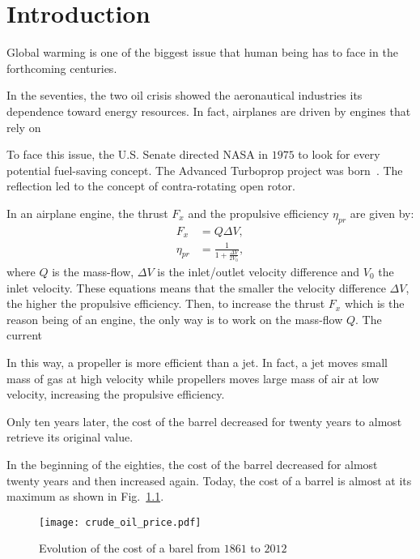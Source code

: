 
\chapter{Introduction}

Global warming is one of the biggest issue that human being
has to face in the forthcoming centuries. 

In the seventies, the two oil crisis showed the aeronautical 
industries its dependence toward energy resources. In fact,
airplanes are driven by engines that rely on  


To face this issue, the U.S. Senate directed NASA in $1975$
to look for every potential fuel-saving concept. The Advanced Turboprop
project was born~\cite{Hager1988}. The reflection led to the
concept of contra-rotating open rotor.

In an airplane engine, 
the thrust $F_x$ and the propulsive efficiency $\eta_{pr}$ are given by:
\begin{equation}
	\begin{split}
		F_x &= Q \Delta V, \\
		\eta_{pr} &= \displaystyle \frac{1}{1 + \displaystyle \frac{\Delta V}{2 V_0}},
	\end{split}
\end{equation}
where $Q$ is the mass-flow, $\Delta V$ is the inlet/outlet velocity difference and $V_0$
the inlet velocity. These equations means that the 
smaller the velocity difference $\Delta V$, the higher the propulsive efficiency.
Then, to increase the thrust $F_x$ which is the reason being of an engine,
the only way is to work on the mass-flow $Q$.
The current

In this way, a propeller is more efficient than a jet. In fact, a jet 
moves small mass of gas at high velocity while propellers moves 
large mass of air at low velocity, increasing the propulsive efficiency.

Only ten years later, the cost of 
the barrel decreased for twenty years to almost retrieve its original
value. 

In the beginning of the eighties, the cost of 
the barrel decreased for almost twenty years and then increased again.
Today, the cost of a barrel is almost at its maximum as shown
in Fig.~\ref{fig:crude_oil_price}.
\begin{figure}[htp]
  \centering
  \texttt{[image: crude\_oil\_price.pdf]}
  \caption{Evolution of the cost of a barel from $1861$ to $2012$ \cite{bpreview2013}}
  \label{fig:crude_oil_price}
\end{figure}

